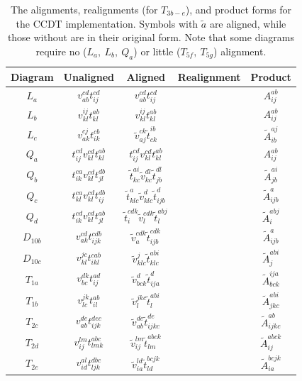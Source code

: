 \documentclass[10pt,twoside]{report}
\begin{document}
	\begin{table}[h]
		\centering
		\captionsetup{width=.8\textwidth}
		\caption{The alignments, realignments (for $T_{3b-e}$), and product forms for the CCDT implementation. Symbols with $\tilde{a}$ are aligned, while those without are in their original form. Note that some diagrams require no ($L_a,\:L_b,\:Q_a$) or little ($T_{5f},\:T_{5g}$) alignment.}
		\begin{tabular}{ccccc}
			Diagram & Unaligned & Aligned & Realignment & Product \\ \hline
			$L_a$ & $v_{ab}^{cd}t_{ij}^{cd}$ & $v_{ab}^{cd}t_{ij}^{cd}$ & & $A_{ij}^{ab}$\\
			$L_b$ & $v_{kl}^{ij}t_{kl}^{ab}$ & $v_{kl}^{ij}t_{kl}^{ab}$ & & $A_{ij}^{ab}$\\
			$L_c$ & $v_{ak}^{cj}t_{ik}^{cb}$ & $\tilde{v}_{aj}^{ck}\tilde{t}_{ck}^{ib}$ & & $\tilde{A}_{ib}^{aj}$\\
			$Q_a$ & $t_{ij}^{cd}v_{kl}^{cd}t_{kl}^{ab}$ & $t_{ij}^{cd}v_{kl}^{cd}t_{kl}^{ab}$ & & $A_{ij}^{ab}$\\
			$Q_b$ & $t_{ik}^{ca}v_{kl}^{cd}t_{jl}^{db}$ & $\tilde{t}_{kc}^{ai}\tilde{v}_{kc}^{dl}\tilde{t}_{jb}^{dl}$ & & $\tilde{A}_{jb}^{ai}$\\
			$Q_c$ & $t_{kl}^{ca}v_{kl}^{cd}t_{ij}^{db}$ & $\tilde{t}_{klc}^{a}\tilde{v}_{klc}^{d}\tilde{t}_{ijb}^{d}$ & & $\tilde{A}_{ijb}^a$ \\
			$Q_d$ & $t_{ik}^{cd}v_{kl}^{cd}t_{jl}^{ab}$ & $\tilde{t}_{i}^{cdk}\tilde{v}_{l}^{cdk}\tilde{t}_{l}^{abj}$ & & $\tilde{A}_{i}^{abj}$ \\
			$D_{10b}$ & $v_{ak}^{cd}t_{ijk}^{cdb}$ & $\tilde{v}^{cdk}_{a}\tilde{t}_{ijb}^{cdk}$ & & $\tilde{A}_{ijb}^a$ \\
			$D_{10c}$ & $v_{kl}^{jc}t_{ikl}^{cab}$ & $\tilde{v}_{klc}^{j}\tilde{t}_{klc}^{abi}$ & & $\tilde{A}_{j}^{abi}$ \\
			$T_{1a}$ & $v_{bc}^{dk}t_{ij}^{ad}$ & $\tilde{v}_{bck}^{d}\tilde{t}_{ija}^{d}$ & & $\tilde{A}_{bck}^{ija}$ \\
			$T_{1b}$ & $v_{lc}^{jk}t_{il}^{ab}$ & $\tilde{v}_{l}^{jkc}\tilde{t}_{l}^{abi}$ & & $\tilde{A}_{jkc}^{abi}$ \\
			$T_{2c}$ & $v_{ab}^{de}t_{ijk}^{dec}$ & $\tilde{v}_{ab}^{de}\tilde{t}_{ijkc}^{de}$ & & $\tilde{A}_{ijkc}^{ab}$ \\
			$T_{2d}$ & $v_{ij}^{lm}t_{lmk}^{abc}$ & $\tilde{v}_{ij}^{lm}\tilde{t}_{lm}^{abck}$ & & $\tilde{A}_{ij}^{abck}$ \\
			$T_{2e}$ & $v_{id}^{al}t_{ljk}^{dbc}$ & $\tilde{v}_{ia}^{ld}\tilde{t}_{ld}^{bcjk}$ & & $\tilde{A}_{ia}^{bcjk}$ \\

\end{tabular}
\end{table}
\end{document}
